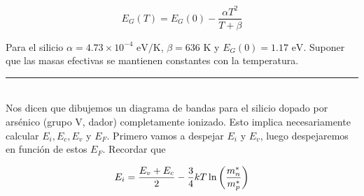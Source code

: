 \begin{equation}
	E_G(T) = E_G(0) - \frac{\alpha T^2}{T + \beta}
\end{equation}

Para el silicio $\alpha = 4.73 \times 10^{-4} \text{ eV/K}$, $\beta = 636 \text{ K}$ y $E_G(0) = 1.17 \text{ eV}$. Suponer que las masas efectivas se mantienen constantes con la temperatura.



\rule{\textwidth}{0.1pt} \\[2pt]


Nos dicen que dibujemos un diagrama de bandas para el silicio dopado por arsénico (grupo V, dador) completamente ionizado. Esto implica necesariamente calcular $E_i,E_c,E_v$ y $E_F$. Primero vamos a despejar $E_i$ y $E_v$, luego despejaremos en función de estos $E_F$. Recordar que

\begin{equation}
	E_i = \frac{E_v+E_c}{2} - \frac{3}{4} kT \ln\left( \frac{m_n^*}{m_p^*} \right)
\end{equation}

